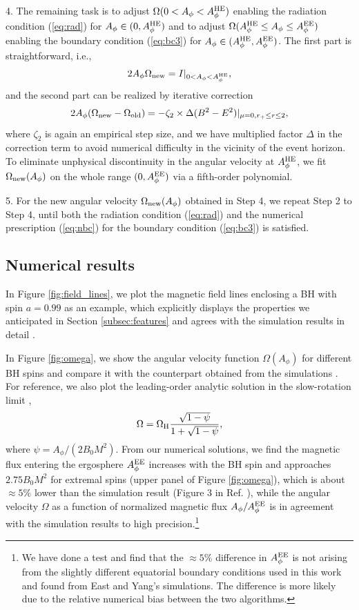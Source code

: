 \documentclass[aps,prd,reprint,nofootinbib, superscriptaddress]{revtex4-1}
\def\Ap{A_\phi}
\def\be{\begin{equation}}
\def\ee{\end{equation}}
\def\WH{\Omega_{\rm H}}
\def\AHE{A_\phi^{\rm HE}}
\def\AEE{A_\phi^{\rm EE}}
\begin{document}
4. The remaining task is to adjust  $\Omega(0< \Ap < \AHE)$ enabling  the radiation condition (\ref{eq:rad})
 for $A_\phi \in (0, A_\phi^{\rm HE})$ and  to adjust $\Omega(\AHE \leq \Ap \leq \AEE)$
 enabling the boundary condition (\ref{eq:bc3}) for $\Ap \in (\AHE, \AEE)$.
 The first part is straightforward, i.e.,
 \be
2\Ap\Omega_{\rm new}  = I|_{0 < \Ap < \AHE},
 \ee
 and the second part can be realized by iterative correction
 \be
2\Ap(\Omega_{\rm new} - \Omega_{\rm old}) =  - \zeta_2\times\Delta (B^2-E^2)|_{\mu=0, r_+\leq r \leq 2},
 \ee
 where $\zeta_2$ is again an empirical step size, and we have multiplied factor $\Delta$
 in the correction term to avoid numerical difficulty in the vicinity of the event horizon.
 To eliminate unphysical discontinuity in the angular
 velocity at $\AHE$, we fit $\Omega_{\rm new}(\Ap)$ on the whole range
 $(0, \AEE)$ via a fifth-order polynomial.

 5. For the new angular velocity $\Omega_{\rm new}(\Ap)$ obtained in Step 4, we repeat Step 2 to Step 4,
 until both the radiation condition (\ref{eq:rad}) and the numerical prescription (\ref{eq:nbc}) for the boundary condition (\ref{eq:bc3}) is satisfied.

\subsection{Numerical results}

In Figure \ref{fig:field_lines}, we plot the magnetic field lines enclosing a BH with spin $a =0.99$ as an example,
which explicitly displays the properties we anticipated in Section \ref{subsec:features} and agrees with
the simulation results in detail \cite{East2018}.

In Figure \ref{fig:omega}, we show the angular velocity function $\Omega(A_\phi)$ for different BH spins and
compare it with the counterpart obtained from the simulations \cite{East2018}.
For reference, we also plot the leading-order analytic solution in the slow-rotation
limit \cite{Beskin2013, Pan2014, Gralla2015, East2018},
\be
    \Omega = \WH\frac{\sqrt{1-\psi}} {1+\sqrt{1-\psi}},
\ee
where $\psi = \Ap/(2B_0M^2)$.
From our numerical solutions, we find the magnetic flux entering the ergosphere $\AEE$ increases with
the BH spin and approaches $2.75 B_0 M^2$ for extremal spins (upper panel of Figure \ref{fig:omega}),
which is about $\approx 5\%$ lower than the simulation result (Figure 3 in Ref. \cite{East2018}),
while the angular velocity $\Omega$ as a function
of normalized magnetic flux $\Ap/\AEE$ is in agreement with the
simulation results to high precision.\footnote{We have done a test and
find that the $\approx 5\%$ difference in $\AEE$ is not arising from the slightly
different equatorial boundary conditions used in this work and found from East and Yang's simulations.
The difference is more likely due to the relative numerical bias between the two algorithms. }
\end{document}
